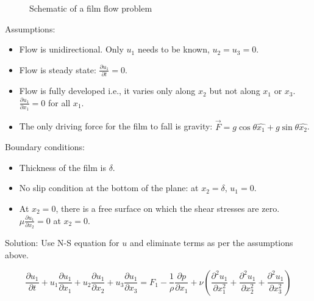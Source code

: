 \begin{figure}[h]
\begin{center}
\end{center}
\caption{Schematic of a film flow problem}
\label{fallfilm}
\end{figure}


Assumptions:
\begin{itemize}
\item Flow is unidirectional. Only $u_1$ needs to be known, $u_2=u_3=0$.
\item Flow is steady state: $\frac{\partial u_1}{\partial t}=0$.
\item Flow is fully developed i.e., it varies only along $x_2$ but not along $x_1$ or $x_3$. $\frac{\partial u_1}{\partial x_1} = 0$ for all $x_1$. 
\item The only driving force for the film to fall is gravity: $\vec{F} = g\cos\theta \hat{x_1} + g\sin\theta \hat{x_2}$.
\end{itemize}


Boundary conditions:
\begin{itemize}
\item Thickness of the film is $\delta$.
\item No slip condition at the bottom of the plane: at $x_2= \delta$, $u_1=0$.
\item At $x_2 = 0$, there is a free surface on which the shear stresses are zero. $\mu \frac{\partial u_1}{\partial x_2}=0$ at $x_2 = 0$.
\end{itemize}


Solution:
Use N-S equation for $u$ and eliminate terms as per the assumptions above.

\begin{equation}
\frac{\partial u_1}{\partial t} + u_1\frac{\partial u_1}{\partial x_1} + u_2\frac{\partial u_1}{\partial x_2} + u_3\frac{\partial u_1}{\partial x_3} = F_1 -  \frac{1}{\rho}\frac{\partial p}{\partial x_1} + \nu \left( \frac{\partial^2 u_1}{\partial x_1^2} + \frac{\partial^2 u_1}{\partial x_2^2} + \frac{\partial^2 u_1}{\partial x_3^2} \right)
\end{equation} 

